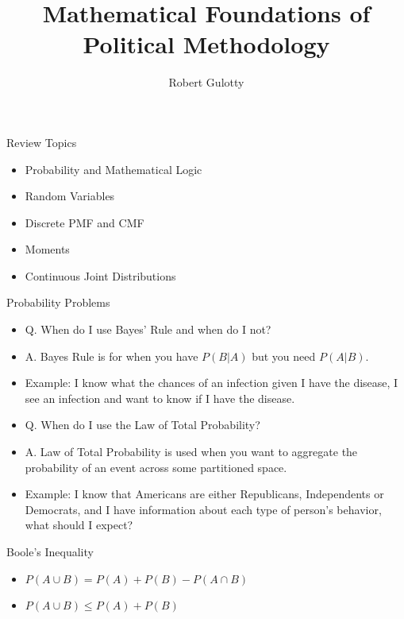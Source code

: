 \documentclass{beamer}
\title[PLSC 43401]{Mathematical Foundations of Political Methodology}
\author{Robert Gulotty}
\institute[Chicago]{University of Chicago}
\numberwithin{equation}{section}
\begin{document}
\begin{frame}
\titlepage
\end{frame}


\begin{frame}{Review Topics}

\begin{itemize}
\item Probability and Mathematical Logic
\item Random Variables
\item Discrete PMF and CMF
\item Moments
\item Continuous Joint Distributions
\end{itemize}

\end{frame}





\begin{frame}{Probability Problems}

\begin{itemize}

\item Q. When do I use Bayes' Rule and when do I not? \pause
\item A. Bayes Rule is for when you have $P(B|A)$ but you need $P(A|B)$.  \pause
\item Example: I know what the chances of an infection given I have the disease, I see an infection and want to know if I have the disease.\pause
\item Q. When do I use the Law of Total Probability? \pause
\item A. Law of Total Probability is used when you want to aggregate the probability of an event across some partitioned space.\pause
\item Example: I know that Americans are either Republicans, Independents or Democrats, and I have information about each type of person's behavior, what should I expect?
\end{itemize}

\end{frame}

\begin{frame}{Boole's Inequality}

\begin{itemize}

\item $P(A\cup B) = P(A)+P(B)-P(A\cap B)$
\item $P(A\cup B) \leq P(A)+P(B)$
\end{itemize}

\end{frame}
\end{document}
